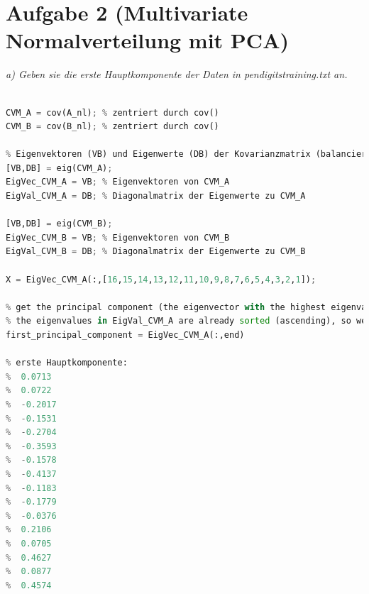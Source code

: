 \documentclass[12pt]{article}
\begin{document}
\section{Aufgabe 2 (Multivariate Normalverteilung mit PCA)}
\textit{a) Geben sie die erste Hauptkomponente der Daten in pendigits­training.txt​ an.}\\
\\
\begin{lstlisting}[language=Python]
% Kovarianzmatrix
CVM_A = cov(A_nl); % zentriert durch cov()
CVM_B = cov(B_nl); % zentriert durch cov()

% Eigenvektoren (VB) und Eigenwerte (DB) der Kovarianzmatrix (balanciert)
[VB,DB] = eig(CVM_A);
EigVec_CVM_A = VB; % Eigenvektoren von CVM_A
EigVal_CVM_A = DB; % Diagonalmatrix der Eigenwerte zu CVM_A

[VB,DB] = eig(CVM_B);
EigVec_CVM_B = VB; % Eigenvektoren von CVM_B
EigVal_CVM_B = DB; % Diagonalmatrix der Eigenwerte zu CVM_B

X = EigVec_CVM_A(:,[16,15,14,13,12,11,10,9,8,7,6,5,4,3,2,1]);

% get the principal component (the eigenvector with the highest eigenvalue):
% the eigenvalues in EigVal_CVM_A are already sorted (ascending), so we can just get the last column:
first_principal_component = EigVec_CVM_A(:,end)

% erste Hauptkomponente:
%  0.0713
%  0.0722
%  -0.2017
%  -0.1531
%  -0.2704
%  -0.3593
%  -0.1578
%  -0.4137
%  -0.1183
%  -0.1779
%  -0.0376
%  0.2106
%  0.0705
%  0.4627
%  0.0877
%  0.4574
\end{lstlisting}
\end{document}
